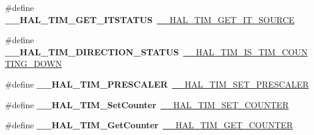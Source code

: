 \begin{DoxyCompactItemize}
\item 
\hypertarget{group___h_a_l___t_i_m___aliased___macros_ga5b35f7cd15ac31c7b1a9596ac8521f36}{\#define {\bfseries \-\_\-\-\_\-\-H\-A\-L\-\_\-\-T\-I\-M\-\_\-\-G\-E\-T\-\_\-\-I\-T\-S\-T\-A\-T\-U\-S}~\hyperlink{group___t_i_m___exported___macros_ga644babf93470a6eee6bce8906c4da5c5}{\-\_\-\-\_\-\-H\-A\-L\-\_\-\-T\-I\-M\-\_\-\-G\-E\-T\-\_\-\-I\-T\-\_\-\-S\-O\-U\-R\-C\-E}}\label{group___h_a_l___t_i_m___aliased___macros_ga5b35f7cd15ac31c7b1a9596ac8521f36}

\item 
\hypertarget{group___h_a_l___t_i_m___aliased___macros_ga76886ef4a5712e8627ea09ff564cdff2}{\#define {\bfseries \-\_\-\-\_\-\-H\-A\-L\-\_\-\-T\-I\-M\-\_\-\-D\-I\-R\-E\-C\-T\-I\-O\-N\-\_\-\-S\-T\-A\-T\-U\-S}~\hyperlink{group___t_i_m___exported___macros_gac73f5e7669d92971830481e7298e98ba}{\-\_\-\-\_\-\-H\-A\-L\-\_\-\-T\-I\-M\-\_\-\-I\-S\-\_\-\-T\-I\-M\-\_\-\-C\-O\-U\-N\-T\-I\-N\-G\-\_\-\-D\-O\-W\-N}}\label{group___h_a_l___t_i_m___aliased___macros_ga76886ef4a5712e8627ea09ff564cdff2}

\item 
\hypertarget{group___h_a_l___t_i_m___aliased___macros_ga64fdbe2a68fc8459071ee0dcb9096e34}{\#define {\bfseries \-\_\-\-\_\-\-H\-A\-L\-\_\-\-T\-I\-M\-\_\-\-P\-R\-E\-S\-C\-A\-L\-E\-R}~\hyperlink{group___t_i_m___exported___macros_gafdc5a06eab07e0c24e729fd492bdb27c}{\-\_\-\-\_\-\-H\-A\-L\-\_\-\-T\-I\-M\-\_\-\-S\-E\-T\-\_\-\-P\-R\-E\-S\-C\-A\-L\-E\-R}}\label{group___h_a_l___t_i_m___aliased___macros_ga64fdbe2a68fc8459071ee0dcb9096e34}

\item 
\hypertarget{group___h_a_l___t_i_m___aliased___macros_ga23ef14334077dc01d9e6d8bfa6614260}{\#define {\bfseries \-\_\-\-\_\-\-H\-A\-L\-\_\-\-T\-I\-M\-\_\-\-Set\-Counter}~\hyperlink{group___t_i_m___exported___macros_ga9746ac75e4cd25cec1a9ebac8cb82b97}{\-\_\-\-\_\-\-H\-A\-L\-\_\-\-T\-I\-M\-\_\-\-S\-E\-T\-\_\-\-C\-O\-U\-N\-T\-E\-R}}\label{group___h_a_l___t_i_m___aliased___macros_ga23ef14334077dc01d9e6d8bfa6614260}

\item 
\hypertarget{group___h_a_l___t_i_m___aliased___macros_ga074ff6af2efe776a0e76622bf8d4c85a}{\#define {\bfseries \-\_\-\-\_\-\-H\-A\-L\-\_\-\-T\-I\-M\-\_\-\-Get\-Counter}~\hyperlink{group___t_i_m___exported___macros_gaf1af08014b9d06efbbb091d58d47c8ba}{\-\_\-\-\_\-\-H\-A\-L\-\_\-\-T\-I\-M\-\_\-\-G\-E\-T\-\_\-\-C\-O\-U\-N\-T\-E\-R}}\label{group___h_a_l___t_i_m___aliased___macros_ga074ff6af2efe776a0e76622bf8d4c85a}


\end{DoxyCompactItemize}
